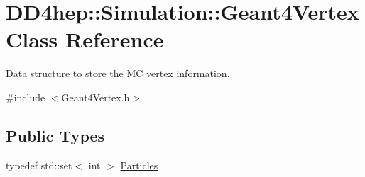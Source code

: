\hypertarget{class_d_d4hep_1_1_simulation_1_1_geant4_vertex}{}\section{D\+D4hep\+:\+:Simulation\+:\+:Geant4\+Vertex Class Reference}
\label{class_d_d4hep_1_1_simulation_1_1_geant4_vertex}


Data structure to store the MC vertex information.  




{\ttfamily \#include $<$Geant4\+Vertex.\+h$>$}

\subsection*{Public Types}
\begin{DoxyCompactItemize}
\item 
typedef std\+::set$<$ int $>$ \hyperlink{class_d_d4hep_1_1_simulation_1_1_geant4_vertex_a7a0331b96dfa8ff9b4a802caa8dd031c}{Particles}
\end{DoxyCompactItemize}
